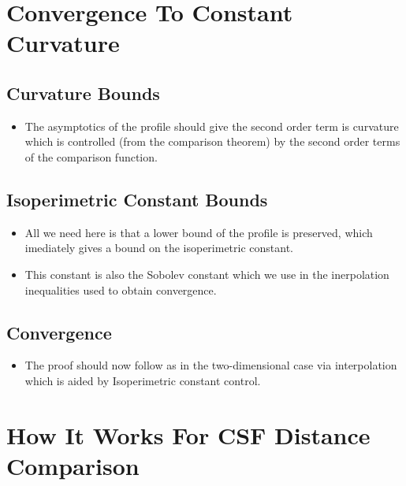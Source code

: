 \documentclass{amsart}
\begin{document}
\section{Convergence To Constant Curvature}

\subsection{Curvature Bounds}

\begin{itemize}
\item The asymptotics of the profile should give the second order term is curvature which is controlled (from the comparison theorem) by the second order terms of the comparison function.
\end{itemize}

\subsection{Isoperimetric Constant Bounds}

\begin{itemize}
\item All we need here is that a lower bound of the profile is preserved, which imediately gives a bound on the isoperimetric constant.
\item This constant is also the Sobolev constant which we use in the inerpolation inequalities used to obtain convergence.
\end{itemize}


\subsection{Convergence}

\begin{itemize}
\item The proof should now follow as in the two-dimensional case via interpolation which is aided by Isoperimetric constant control.
\end{itemize}

\subsection{}

\section{How It Works For CSF Distance Comparison}
\end{document}

